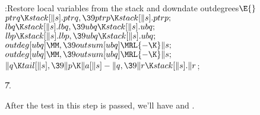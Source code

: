 \B{}:Restore local variables from the stack and downdate
outdegrees\X${}\E{}$\6
$\\{ptrq}\K\\{stack}[\|s].\\{ptrq},\39\\{ptrp}\K\\{stack}[\|s].\\{ptrp};{}$\6
${}\\{lbq}\K\\{stack}[\|s].\\{lbq},\39\\{ubq}\K\\{stack}[\|s].\\{ubq};{}$\6
${}\\{lbp}\K\\{stack}[\|s].\\{lbp},\39\\{ubq}\K\\{stack}[\|s].\\{ubq};{}$\6
${}\\{outdeg}[\\{ubq}]\MM,\39\\{outsum}[\\{ubq}]\MRL{-{\K}}\|s;{}$\6
${}\\{outdeg}[\\{ubq}]\MM,\39\\{outsum}[\\{ubq}]\MRL{-{\K}}\|s;{}$\6
${}\|q\K\\{tail}[\|s],\39\|p\K\|a[\|s]-\|q,\39\|r\K\\{stack}[\|s].\|r{}$;\par
\U7.\fi

After the test in this step is passed, we'll have  and .

